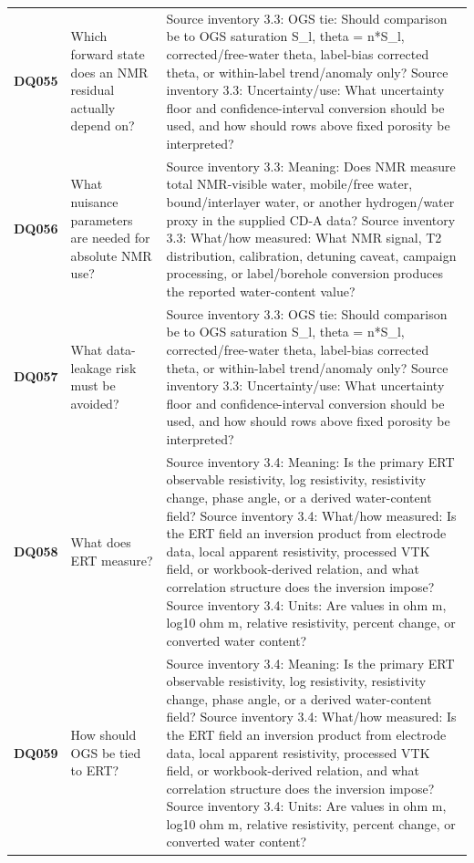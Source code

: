\begin{longtable}{@{}L{0.09\textwidth} L{0.31\textwidth} L{0.52\textwidth}@{}}
\addlinespace[0.18em]
\textbf{DQ055} & Which forward state does an NMR residual actually depend on? & Source inventory 3.3: OGS tie: Should comparison be to OGS saturation S\_l, theta = n*S\_l, corrected/free-water theta, label-bias corrected theta, or within-label trend/anomaly only? Source inventory 3.3: Uncertainty/use: What uncertainty floor and confidence-interval conversion should be used, and how should rows above fixed porosity be interpreted?\\
\addlinespace[0.18em]
\textbf{DQ056} & What nuisance parameters are needed for absolute NMR use? & Source inventory 3.3: Meaning: Does NMR measure total NMR-visible water, mobile/free water, bound/interlayer water, or another hydrogen/water proxy in the supplied CD-A data? Source inventory 3.3: What/how measured: What NMR signal, T2 distribution, calibration, detuning caveat, campaign processing, or label/borehole conversion produces the reported water-content value?\\
\addlinespace[0.18em]
\textbf{DQ057} & What data-leakage risk must be avoided? & Source inventory 3.3: OGS tie: Should comparison be to OGS saturation S\_l, theta = n*S\_l, corrected/free-water theta, label-bias corrected theta, or within-label trend/anomaly only? Source inventory 3.3: Uncertainty/use: What uncertainty floor and confidence-interval conversion should be used, and how should rows above fixed porosity be interpreted?\\
\addlinespace[0.18em]
\textbf{DQ058} & What does ERT measure? & Source inventory 3.4: Meaning: Is the primary ERT observable resistivity, log resistivity, resistivity change, phase angle, or a derived water-content field? Source inventory 3.4: What/how measured: Is the ERT field an inversion product from electrode data, local apparent resistivity, processed VTK field, or workbook-derived relation, and what correlation structure does the inversion impose? Source inventory 3.4: Units: Are values in ohm m, log10 ohm m, relative resistivity, percent change, or converted water content?\\
\addlinespace[0.18em]
\textbf{DQ059} & How should OGS be tied to ERT? & Source inventory 3.4: Meaning: Is the primary ERT observable resistivity, log resistivity, resistivity change, phase angle, or a derived water-content field? Source inventory 3.4: What/how measured: Is the ERT field an inversion product from electrode data, local apparent resistivity, processed VTK field, or workbook-derived relation, and what correlation structure does the inversion impose? Source inventory 3.4: Units: Are values in ohm m, log10 ohm m, relative resistivity, percent change, or converted water content?\\

\end{longtable}
